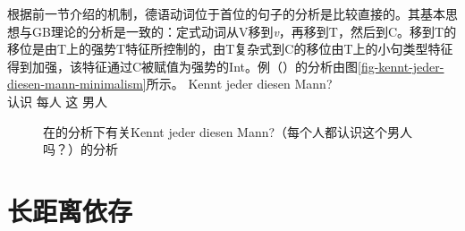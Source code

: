根据前一节介绍的机制，德语动词位于首位的句子的分析是比较直接的。其基本思想与GB理论的分析是一致的：定式动词从V移到\textit{v}，再移到T，然后到C。移到T的移位是由T上的强势T特征所控制的，由T复杂式到C的移位由T上的小句类型特征得到加强，该特征通过C被赋值为强势的Int。例（）的分析由图\vref{fig-kennt-jeder-diesen-mann-minimalism}所示。
\ea
\gll Kennt jeder diesen Mann?\\
     认识 每人 这 男人\\
\z
\begin{figure}
\caption{\label{fig-kennt-jeder-diesen-mann-minimalism}在\citet{Adger2003a}的分析下有关Kennt jeder diesen Mann?（每个人都认识这个男人吗？）的分析}
\end{figure}%

\section{长距离依存}

